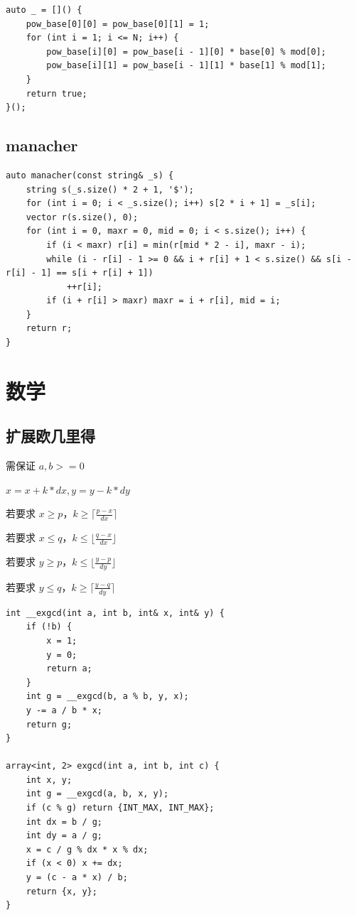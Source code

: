 \documentclass[UTF8, twoside]{ctexart}
\begin{document}
\begin{sloppypar}
\begin{lstlisting}[style=cpp]
auto _ = []() {
    pow_base[0][0] = pow_base[0][1] = 1;
    for (int i = 1; i <= N; i++) {
        pow_base[i][0] = pow_base[i - 1][0] * base[0] % mod[0];
        pow_base[i][1] = pow_base[i - 1][1] * base[1] % mod[1];
    }
    return true;
}();
\end{lstlisting}

\subsection{manacher}

\begin{lstlisting}[style=cpp]
auto manacher(const string& _s) {
    string s(_s.size() * 2 + 1, '$');
    for (int i = 0; i < _s.size(); i++) s[2 * i + 1] = _s[i];
    vector r(s.size(), 0);
    for (int i = 0, maxr = 0, mid = 0; i < s.size(); i++) {
        if (i < maxr) r[i] = min(r[mid * 2 - i], maxr - i);
        while (i - r[i] - 1 >= 0 && i + r[i] + 1 < s.size() && s[i - r[i] - 1] == s[i + r[i] + 1])
            ++r[i];
        if (i + r[i] > maxr) maxr = i + r[i], mid = i;
    }
    return r;
}
\end{lstlisting}

\clearpage

\section{数学}

\subsection{扩展欧几里得}

需保证 $a,b>=0$

$x=x+k*dx,y=y-k*dy$

若要求 $x\ge p$，$k\ge\lceil \frac{p-x}{dx}\rceil$

若要求 $x\le q$，$k\le\lfloor \frac{q-x}{dx}\rfloor$

若要求 $y\ge p$，$k\le\lfloor \frac{y-p}{dy}\rfloor$

若要求 $y\le q$，$k\ge\lceil \frac{y-q}{dy}\rceil$

\begin{lstlisting}[style=cpp]
int __exgcd(int a, int b, int& x, int& y) {
    if (!b) {
        x = 1;
        y = 0;
        return a;
    }
    int g = __exgcd(b, a % b, y, x);
    y -= a / b * x;
    return g;
}

array<int, 2> exgcd(int a, int b, int c) {
    int x, y;
    int g = __exgcd(a, b, x, y);
    if (c % g) return {INT_MAX, INT_MAX};
    int dx = b / g;
    int dy = a / g;
    x = c / g % dx * x % dx;
    if (x < 0) x += dx;
    y = (c - a * x) / b;
    return {x, y};
}
\end{lstlisting}


\end{sloppypar}
\end{document}
